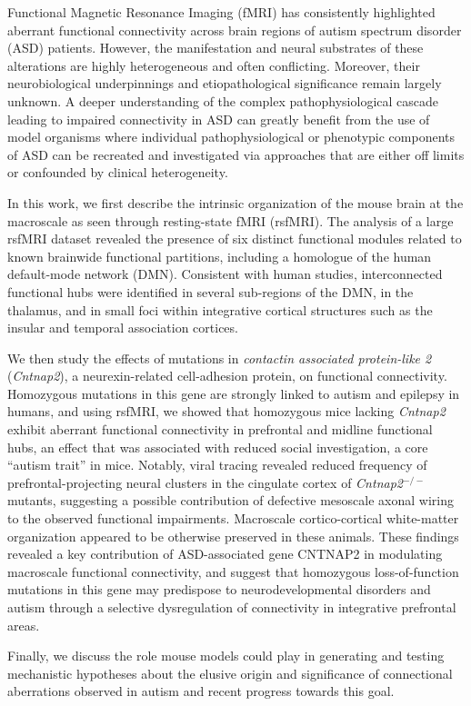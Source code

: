 Functional Magnetic Resonance Imaging (fMRI) has consistently highlighted
aberrant functional connectivity across brain regions of autism spectrum
disorder (ASD) patients. However, the manifestation and neural substrates of
these alterations are highly heterogeneous and often conflicting. Moreover,
their neurobiological underpinnings and etiopathological significance remain
largely unknown. A deeper understanding of the complex pathophysiological
cascade leading to impaired connectivity in ASD can greatly benefit from the use
of model organisms where individual pathophysiological or phenotypic components
of ASD can be recreated and investigated via approaches that are either off
limits or confounded by clinical heterogeneity.

In this work, we first describe the intrinsic organization of the mouse brain at
the macroscale as seen through resting-state fMRI (rsfMRI). The analysis of a
large rsfMRI dataset revealed the presence of six distinct functional modules
related to known brainwide functional partitions, including a homologue of the
human default-mode network (DMN). Consistent with human studies, interconnected
functional hubs were identified in several sub-regions of the DMN, in the
thalamus, and in small foci within integrative cortical structures such as the
insular and temporal association cortices.

We then study the effects of mutations in \textit{contactin associated
protein-like 2} (\textit{Cntnap2}), a neurexin-related cell-adhesion protein, on
functional connectivity.  Homozygous mutations in this gene are strongly linked
to autism and epilepsy in humans, and using rsfMRI, we showed that homozygous
mice lacking \textit{Cntnap2} exhibit aberrant functional connectivity in
prefrontal and midline functional hubs, an effect that was associated with
reduced social investigation, a core “autism trait” in mice.  Notably, viral
tracing revealed reduced frequency of prefrontal-projecting neural clusters in
the cingulate cortex of \textit{Cntnap2}$^{-/-}$ mutants, suggesting a possible
contribution of defective mesoscale axonal wiring to the observed functional
impairments.  Macroscale cortico-cortical white-matter organization appeared to
be otherwise preserved in these animals. These findings revealed a key
contribution of ASD-associated gene CNTNAP2 in modulating macroscale functional
connectivity, and suggest that homozygous loss-of-function mutations in this
gene may predispose to neurodevelopmental disorders and autism through a
selective dysregulation of connectivity in integrative prefrontal areas.

Finally, we discuss the role mouse models could play in generating and testing
mechanistic hypotheses about the elusive origin and significance of connectional
aberrations observed in autism and recent progress towards this goal.
